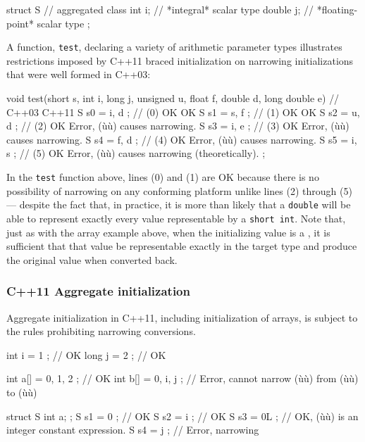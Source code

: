 \begin{emcppslisting}
struct S  // aggregated class
{
    int    i;  // *integral* scalar type
    double j;  // *floating-point* scalar type
};
\end{emcppslisting}


\noindent A function, \lstinline!test!, declaring a variety of arithmetic parameter
types illustrates restrictions imposed by C++11 braced initialization on
narrowing initializations that were well formed in C++03:

\begin{emcppslisting}
void test(short s, int i, long j, unsigned u, float f, double d, long double e)
{                     //     C++03  C++11
    S s0 = { i, d };  // (0)  OK     OK
    S s1 = { s, f };  // (1)  OK     OK
    S s2 = { u, d };  // (2)  OK    Error, (ù{}ù) causes narrowing.
    S s3 = { i, e };  // (3)  OK    Error, (ù{}ù) causes narrowing.
    S s4 = { f, d };  // (4)  OK    Error, (ù{}ù) causes narrowing.
    S s5 = { i, s };  // (5)  OK    Error, (ù{}ù) causes narrowing (theoretically).
};
\end{emcppslisting}


\noindent In the \lstinline!test! function above, lines (0) and (1) are OK because
there is no possibility of narrowing on any conforming platform unlike
lines (2) through (5) --- despite the fact that, in practice, it is more
than likely that a \lstinline!double! will be able to represent exactly
every value representable by a \lstinline!short!~\lstinline!int!. Note that,
just as with the array example above, when the initializing value is a
, it is sufficient that that value be
representable exactly in the target type and produce the original value
when converted back.

\subsubsection[C++11 Aggregate initialization]{C++11 Aggregate initialization}\label{c++11-aggregate-initialization}

Aggregate initialization in C++11, including initialization of arrays,
is subject to the rules prohibiting narrowing conversions.

\begin{emcppslisting}
int  i   = { 1 };        // OK
long j   = { 2 };        // OK

int  a[] = { 0, 1, 2 };  // OK
int  b[] = { 0, i, j };  // Error, cannot narrow (ù{}ù) from (ù{}ù) to (ù{}ù)

struct S { int a; };
S s1 = { 0  };  // OK
S s2 = { i  };  // OK
S s3 = { 0L };  // OK, (ù{}ù) is an integer constant expression.
S s4 = { j  };  // Error, narrowing
\end{emcppslisting}


